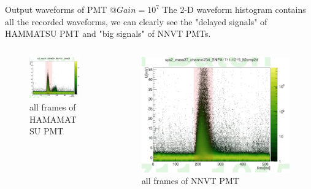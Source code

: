 \begin{frame}{Output waveforms of PMT @$Gain=10^7$}
The 2-D waveform histogram contains all the recorded waveforms, we can clearly see the "delayed signals" of HAMMATSU PMT and "big signals" of NNVT PMTs.
\begin{columns}
\begin{column}{.47\textwidth}
\begin{figure}
\centering
\includegraphics[width=\textwidth]{figures/wave2d.png} %
\caption{all frames of HAMAMATSU PMT}
\end{figure}
\end{column}
\begin{column}{.5\textwidth}
\begin{figure}
\centering
\includegraphics[width=\textwidth]{figures/mcpwave2d.png} %
\caption{all frames of NNVT PMT}
\end{figure}
\end{column}
\end{columns}
\end{frame}
